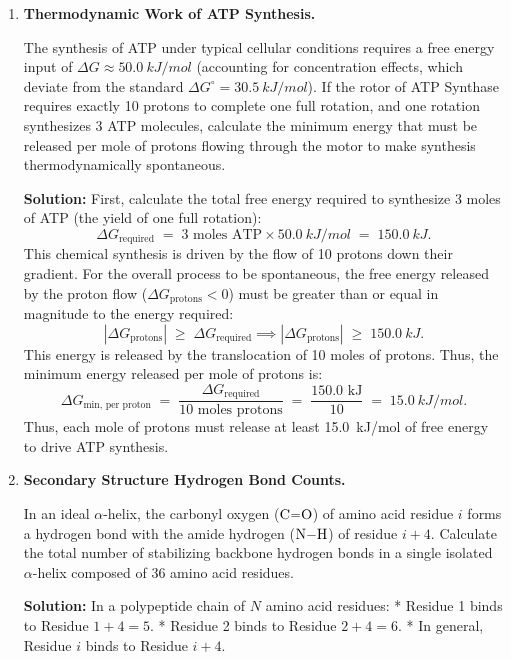 \documentclass[12pt, a4paper]{book}
\begin{document}
\begin{problembox}
\begin{enumerate}[label=\textbf{E\arabic*.}]
  \item \textbf{Thermodynamic Work of ATP Synthesis.}
  
        The synthesis of ATP under typical cellular conditions requires a free energy input of $\Delta G \approx \SI{50.0}{kJ/mol}$ (accounting for concentration effects, which deviate from the standard $\Delta G^\circ = \SI{30.5}{kJ/mol}$).
        If the rotor of ATP Synthase requires exactly 10 protons to complete one full rotation, and one rotation synthesizes 3 ATP molecules, calculate the minimum energy that must be released per mole of protons flowing through the motor to make synthesis thermodynamically spontaneous.
        
        \textbf{Solution:}
        First, calculate the total free energy required to synthesize 3 moles of ATP (the yield of one full rotation):
        \[
          \Delta G_{\text{required}} \;= \; 3 \text{ moles ATP} \times \SI{50.0}{kJ/mol} \;=\; \SI{150.0}{kJ}.
        \]
        This chemical synthesis is driven by the flow of 10 protons down their gradient.
        For the overall process to be spontaneous, the free energy released by the proton flow ($\Delta G_{\text{protons}} < 0$) must be greater than or equal in magnitude to the energy required:
        \[
          |\Delta G_{\text{protons}}| \;\ge\; \Delta G_{\text{required}} \implies |\Delta G_{\text{protons}}| \;\ge\; \SI{150.0}{kJ}.
        \]
        This energy is released by the translocation of 10 moles of protons.
        Thus, the minimum energy released per mole of protons is:
        \[
          \Delta G_{\text{min, per proton}} \;=\; \frac{\Delta G_{\text{required}}}{10 \text{ moles protons}} \;=\; \frac{150.0 \text{ kJ}}{10} \;=\; \SI{15.0}{kJ/mol}.
        \]
        Thus, each mole of protons must release at least \SI{15.0}{kJ/mol} of free energy to drive ATP synthesis.
        
  \item \textbf{Secondary Structure Hydrogen Bond Counts.}
  
        In an ideal $\alpha$-helix, the carbonyl oxygen ($\ce{C=O}$) of amino acid residue $i$ forms a hydrogen bond with the amide hydrogen ($\ce{N-H}$) of residue $i+4$.
        Calculate the total number of stabilizing backbone hydrogen bonds in a single isolated $\alpha$-helix composed of 36 amino acid residues.
        
        \textbf{Solution:}
        In a polypeptide chain of $N$ amino acid residues:
        * Residue 1 binds to Residue $1+4 = 5$.
        * Residue 2 binds to Residue $2+4 = 6$.
        * In general, Residue $i$ binds to Residue $i+4$.
        

\end{enumerate}
\end{problembox}
\end{document}
